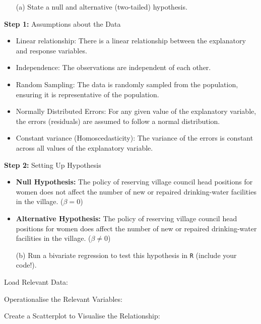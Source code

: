 \documentclass[12pt,letterpaper]{article}
\begin{document}
\newpage
\begin{enumerate}
	\item [(a)] State a null and alternative (two-tailed) hypothesis. 
\end{enumerate}
\noindent\textbf{Step 1:} Assumptions about the Data
\begin{itemize}
	\item 
	Linear relationship: There is a linear relationship between the explanatory  and response variables.
	\item
	Independence: The observations are independent of each other.
	\item 
	Random Sampling: The data is randomly sampled from the population, ensuring it is representative of the population. 
	\item 
	Normally Distributed Errors: For any given value of the explanatory variable, the errors (residuals) are assumed to follow a normal distribution.
	\item 
	Constant variance (Homoscedasticity): The variance of the errors is constant across all values of the explanatory variable.
\end{itemize}

\noindent\textbf{Step 2:} Setting Up Hypothesis
\begin{itemize}
	\item 
	\textbf{Null Hypothesis:} The policy of reserving village council head positions for women does not affect the number of new or repaired drinking-water facilities in the village. ($\beta = 0$)
	\item
	\textbf{Alternative Hypothesis:} The policy of reserving village council head positions for women does affect the number of new or repaired drinking-water facilities in the village. ($\beta \neq 0$)
\end{itemize}

\newpage
\begin{enumerate}
	\item [(b)] Run a bivariate regression to test this hypothesis in \texttt{R} (include your code!).
\end{enumerate}
\vspace{.5cm}
\noindent Load Relevant Data: 

\vspace{.5cm}
\noindent Operationalise the Relevant Variables:

\vspace{.5cm}
\noindent Create a Scatterplot to Visualise the Relationship: 

\end{document}
